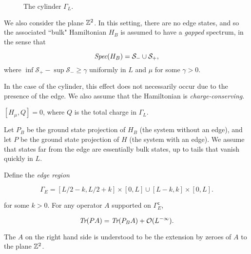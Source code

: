 \documentclass[12pt, letterpaper]{article}
\begin{document}
\newpage
\begin{figure}[h!]
\centering
{}
\caption{The cylinder $\Gamma_L$.}
\label{fig:setup}
\end{figure}

We also consider the plane $\mathbb{Z}^2$. In this setting, there are no edge states, and so the associated ``bulk" Hamiltonian $H_B$ is assumed to have a \textit{gapped} spectrum, in the sense that

\begin{assumption}
\[\emph{Spec}(H_B) = \mathcal{S}_{-} \cup \mathcal{S}_{+},\]
where $\inf\mathcal{S}_{+} - \sup \mathcal{S}_{-} \geq \gamma$ uniformly in $L$ and $\mu$ for some $\gamma > 0$. 
\label{ass:gap}
\end{assumption}

In the case of the cylinder, this effect does not necessarily occur due to the presence of the edge. 
We also assume that the Hamiltonian is \emph{charge-conserving}.

\begin{assumption}
$[H_\mu, Q] = 0$, where $Q$ is the total charge in $\Gamma_L$.
\label{ass:charge}
\end{assumption}

Let $P_B$ be the ground state projection of $H_B$ (the system without an edge), and let $P$ be the ground state projection of $H$ (the system with an edge). We assume that states far from the edge are essentially bulk states, up to tails that vanish quickly in $L$.

\begin{assumption}
Define the \emph{edge region }

\[\Gamma_E = [L/2-k,L/2+k]\times [0,L] \cup [L-k,k]\times [0,L].\]

for some $k>0$. For any operator $A$ supported on $\Gamma_E^\mathsf{c}$,

\[\emph{Tr}(PA) = \emph{Tr}(P_BA) + \mathcal{O}(L^{-\infty}).\]

The $A$ on the right hand side is understood to be the extension by zeroes of $A$ to the plane $\mathbb{Z}^2$.
\label{ass:bulk}
\end{assumption}
\end{document}
